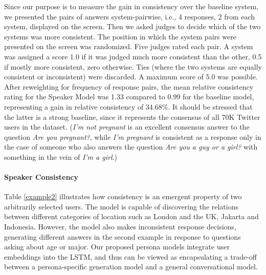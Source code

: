 Since our purpose is to measure the gain in consistency over the baseline system, we presented the pairs of answers system-pairwise, i.e., 4 responses, 2 from each system,  displayed on the screen.
Then we 
 asked judges to decide which of the two systems was more consistent.  The position in which the system pairs were presented on the screen was randomized.  Five judges rated each pair.  A system was assigned a score 1.0 if it was judged much more consistent than the other, 0.5 if mostly more consistent, zero otherwise. Ties (where the two systems are equally consistent or inconsistent) were discarded.  A maximum score of 5.0 was possible. After reweighting for frequency of response  pairs, the mean relative consistency rating for the Speaker Model was 1.33 compared to 0.99 for the baseline model, representing a gain in relative consistency of 34.68\%. It should be stressed that the latter is a strong baseline, since it represents the consensus of all 70K Twitter users in the dataset. ({\it I'm not pregnant} is an excellent consensus answer to the question {\it Are you pregnant?}, while {\it I'm pregnant} is consistent as a response only in the case of someone who also answers the question {\it Are you a guy or a girl?} with something in the vein of {\it I'm a girl}.)

\paragraph{Speaker Consistency}
Table \ref{example2} illustrates how consistency is an emergent property of two arbitrarily selected users. The model is capable of discovering the relations between different categories of location such as London and the UK, Jakarta and Indonesia. However, the model also makes inconsistent response decisions, generating different answers in the second example in response to questions asking about age or major. 
Our proposed persona models integrate user embeddings into the LSTM, and thus can be viewed as encapsulating a trade-off between a persona-specific generation model and a general conversational model. 



